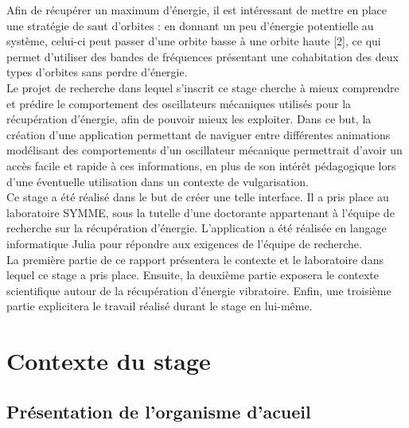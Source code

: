 \documentclass[a4paper, french, 12pt, titlepage]{article}
\begin{document}
Afin de récupérer un maximum d'énergie, il est intéressant de mettre en place une stratégie de saut d'orbites : en donnant un peu d'énergie potentielle au système, celui-ci peut passer d'une orbite basse à une orbite haute [2], ce qui permet d'utiliser des bandes de fréquences présentant une cohabitation des deux types d'orbites sans perdre d'énergie. \\

Le projet de recherche dans lequel s'inscrit ce stage cherche à mieux comprendre et prédire le comportement des oscillateurs mécaniques utilisés pour la récupération d'énergie, afin de pouvoir mieux les exploiter. Dans ce but, la création d'une application permettant de naviguer entre différentes animations modélisant des comportements d'un oscillateur mécanique permettrait d'avoir un accès facile et rapide à ces informations, en plus de son intérêt pédagogique lors d'une éventuelle utilisation dans un contexte de vulgarisation. \\

Ce stage a été réalisé dans le but de créer une telle interface. Il a pris place au laboratoire SYMME, sous la tutelle d'une doctorante appartenant à l'équipe de recherche sur la récupération d'énergie. L'application a été réalisée en langage informatique Julia pour répondre aux exigences de l'équipe de recherche. \\

La première partie de ce rapport présentera le contexte et le laboratoire dans lequel ce stage a pris place. Ensuite, la deuxième partie exposera le contexte scientifique autour de la récupération d'énergie vibratoire. Enfin, une troisième partie explicitera le travail réalisé durant le stage en lui-même. \\ 

\newpage 

\section{Contexte du stage}

\subsection{Présentation de l'organisme d'acueil}
\end{document}
